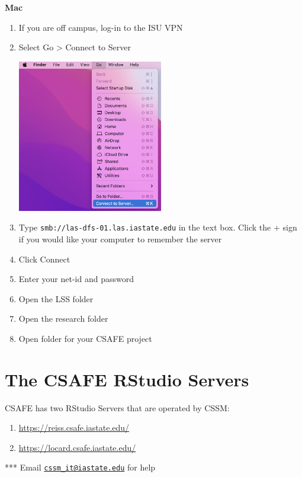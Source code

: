 \documentclass[
]{book}
\providecommand{\tightlist}{%
  \setlength{\itemsep}{0pt}\setlength{\parskip}{0pt}}
\begin{document}
\textbf{Mac}

\begin{enumerate}
\def\labelenumi{\arabic{enumi}.}
\tightlist
\item
  If you are off campus, log-in to the ISU VPN
\item
  Select Go \textgreater{} Connect to Server

  \includegraphics[width=0.5\textwidth,height=0.5\textheight]{images/connect_to_server.png}
\item
  Type \texttt{smb://las-dfs-01.las.iastate.edu} in the text box. Click the + sign if you would like your computer to remember the server
\item
  Click Connect
\item
  Enter your net-id and password
\item
  Open the LSS folder
\item
  Open the research folder
\item
  Open folder for your CSAFE project
\end{enumerate}

\hypertarget{the-csafe-rstudio-servers}{%
\chapter{The CSAFE RStudio Servers}\label{the-csafe-rstudio-servers}}

CSAFE has two RStudio Servers that are operated by CSSM:

\begin{enumerate}
\def\labelenumi{\arabic{enumi}.}
\tightlist
\item
  \url{https://reiss.csafe.iastate.edu/}
\item
  \url{https://locard.csafe.iastate.edu/}
\end{enumerate}

*** Email \href{mailto:cssm_it@iastate.edu}{\nolinkurl{cssm\_it@iastate.edu}} for help
\end{document}
